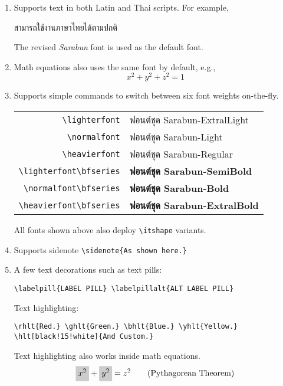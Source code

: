 \documentclass[9pt,a4paper]{extarticle}
\begin{document}
\begin{enumerate}

\item Supports text in both Latin and Thai scripts. For example,
    \begin{center}
        สามารถใช้งานภาษาไทยได้ตามปกติ
    \end{center}
    The revised \textit{Sarabun}
    font is used as the default font.

\item Math equations also uses the same font by default, e.g.,
    \begin{equation}
        x^2 + y^2 + z^2 = 1 \tag{3D Sphere}
    \end{equation}

\item Supports simple commands to switch between six font weights on-the-fly.
    \begin{center}
        \begin{tabular}{rl}
            \verb"\lighterfont" & {\lighterfont ฟอนต์ชุด Sarabun-ExtralLight} \\
            \verb"\normalfont"  & {\normalfont ฟอนต์ชุด Sarabun-Light}     \\
            \verb"\heavierfont" & {\heavierfont ฟอนต์ชุด Sarabun-Regular} \\
            \verb"\lighterfont\bfseries" & {\lighterfont\bfseries ฟอนต์ชุด Sarabun-SemiBold} \\
            \verb"\normalfont\bfseries"  & {\normalfont\bfseries ฟอนต์ชุด Sarabun-Bold}     \\
            \verb"\heavierfont\bfseries" & {\heavierfont\bfseries ฟอนต์ชุด Sarabun-ExtralBold} \\
        \end{tabular}
    \end{center}
    All fonts shown above also deploy \verb"\itshape" variants.

\item Supports sidenote \verb"\sidenote{As shown here.}"

\item A few text decorations such as text pills:  
    \begin{center}
        \verb"\labelpill{LABEL PILL} \labelpillalt{ALT LABEL PILL}"
    \end{center}
    Text highlighting:     
    \begin{center}
        \verb"\rhlt{Red.} \ghlt{Green.} \bhlt{Blue.} \yhlt{Yellow.}" \\
        \verb"\hlt[black!15!white]{And Custom.}"
    \end{center}
    Text highlighting also works inside math equations.
    \begin{equation}
        \hlt{x^2} + \hlt{y^2} = z^2  \tag{Pythagorean Theorem}
    \end{equation}


\end{enumerate}
\end{document}
